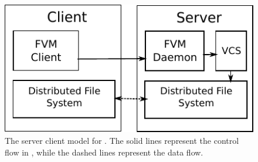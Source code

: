 \begin{figure}[t]
\centerline{\includegraphics{fig/serverclient.pdf}}
\caption{The server client model for \sys. The solid lines represent the control
flow in \sys, while the dashed lines represent the data flow.}
\label{f:server-model}
\end{figure}

\endinput


